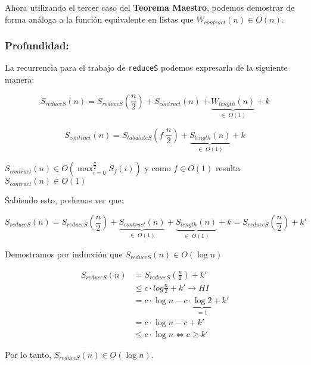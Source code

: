 \documentclass[11pt]{article}
\begin{document}
Ahora utilizando el tercer caso del \textbf{Teorema Maestro}, podemos 
demostrar de forma análoga a la función equivalente en listas que
$W_{contract}(n) \in O(n)$.

\subsubsection{Profundidad:}

La recurrencia para el trabajo de \texttt{reduceS} podemos expresarla de la siguiente manera:

\begin{equation*}
    S_{reduceS}(n) =  S_{reduceS}(\frac{n}{2}) + S_{contract}(n) + \underbrace{W_{length}(n)}_{\in \; O(1)} + k
\end{equation*}

\begin{equation*}
    S_{contract}(n) = S_{tabulateS}(f \; \frac{n}{2}) + \underbrace{S_{length}(n)}_{\in \; O(1)} + k
\end{equation*}

$S_{contract}(n) \in O\left(\displaystyle\max_{i=0}^{\frac{n}{2}}S_f(i)\right) $
y como $f\in O(1)$ resulta $S_{contract}(n) \in O(1)$

Sabiendo esto, podemos ver que:

\begin{equation*}
    S_{reduceS}(n) =  S_{reduceS}(\frac{n}{2}) +  \underbrace{S_{contract}(n) }_{\in \; O(1)} +
    \underbrace{S_{length}(n)}_{\in \; O(1)} + k =  S_{reduceS}(\frac{n}{2}) + k'
\end{equation*}

Demostramos por inducción que $S_{reduceS}(n) \in O(\log{n})$

\begin{align*}
    S_{reduceS}(n) & = S_{reduceS}(\frac{n}{2}) + k' \\
                   & \leq c \cdot log{\frac{n}{2}} + k' \rightarrow HI\\
                   & = c \cdot \log{n} - c \cdot \underbrace{\log{2}}_{= 1} + k' \\
                   & = c \cdot \log{n} - c + k' \\
                   & \leq c \cdot \log{n} \iff c \geq k'
\end{align*}

Por lo tanto, $S_{reduceS}(n) \in O(\log{n})$.

\end{document}
